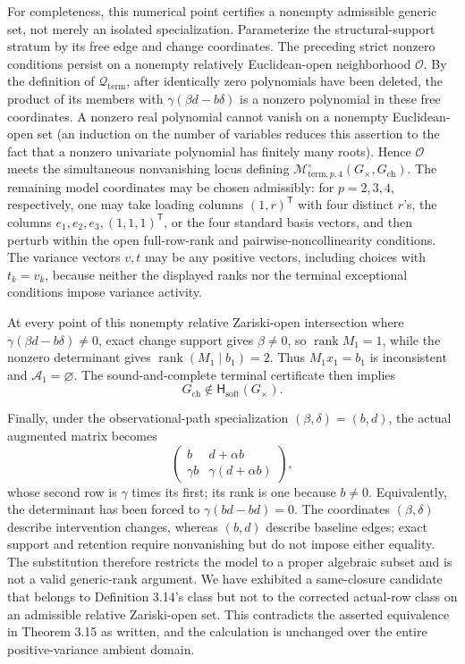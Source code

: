 For completeness, this numerical point certifies a nonempty admissible generic set, not merely an isolated specialization.  Parameterize the structural-support stratum by its free edge and change coordinates.  The preceding strict nonzero conditions persist on a nonempty relatively Euclidean-open neighborhood \(\mathcal O\).  By the definition of \(\mathcal Q_{\mathrm{term}}\), after identically zero polynomials have been deleted, the product of its members with \(\gamma(\beta d-b\delta)\) is a nonzero polynomial in these free coordinates.  A nonzero real polynomial cannot vanish on a nonempty Euclidean-open set (an induction on the number of variables reduces this assertion to the fact that a nonzero univariate polynomial has finitely many roots).  Hence \(\mathcal O\) meets the simultaneous nonvanishing locus defining \(\mathcal M^{\circ}_{\mathrm{term},p,4}(G_{\times},G_{\mathrm{ch}})\).  The remaining model coordinates may be chosen admissibly: for \(p=2,3,4\), respectively, one may take loading columns \((1,r)^{\mathsf T}\) with four distinct \(r\)'s, the columns \(e_1,e_2,e_3,(1,1,1)^{\mathsf T}\), or the four standard basis vectors, and then perturb within the open full-row-rank and pairwise-noncollinearity conditions.  The variance vectors \(v,t\) may be any positive vectors, including choices with \(t_k=v_k\), because neither the displayed ranks nor the terminal exceptional conditions impose variance activity.

At every point of this nonempty relative Zariski-open intersection where \(\gamma(\beta d-b\delta)\ne0\), exact change support gives \(\beta\ne0\), so \(\operatorname{rank}M_1=1\), while the nonzero determinant gives \(\operatorname{rank}(M_1\mid b_1)=2\).  Thus \(M_1x_1=b_1\) is inconsistent and \(\mathcal A_1=\varnothing\).  The sound-and-complete terminal certificate then implies
\[
G_{\mathrm{ch}}\notin\mathsf H_{\mathrm{soft}}(G_{\times}).
\]

Finally, under the observational-path specialization \((\beta,\delta)=(b,d)\), the actual augmented matrix becomes
\[
\begin{pmatrix}
b&d+\alpha b\\
\gamma b&\gamma(d+\alpha b)
\end{pmatrix},
\]
whose second row is \(\gamma\) times its first; its rank is one because \(b\ne0\).  Equivalently, the determinant has been forced to \(\gamma(bd-bd)=0\).  The coordinates \((\beta,\delta)\) describe intervention changes, whereas \((b,d)\) describe baseline edges; exact support and retention require nonvanishing but do not impose either equality.  The substitution therefore restricts the model to a proper algebraic subset and is not a valid generic-rank argument.  We have exhibited a same-closure candidate that belongs to Definition 3.14's class but not to the corrected actual-row class on an admissible relative Zariski-open set.  This contradicts the asserted equivalence in Theorem 3.15 as written, and the calculation is unchanged over the entire positive-variance ambient domain.
